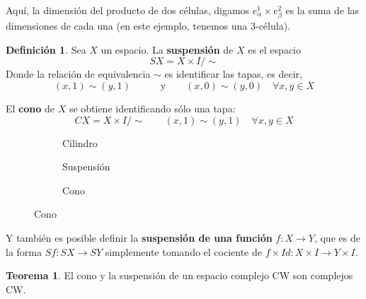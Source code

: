 \documentclass[spanish]{book}
\theoremstyle{definition}
\newtheorem*{defn}{Definición}
\newtheorem*{teo}{Teorema}
\begin{document}
	Aquí, la dimensión del producto de dos células, digamos $e^1_\alpha\times e^2_\beta$ es la suma de las dimensiones de cada una (en este ejemplo, tenemos una 3-célula).
	\begin{defn}
		Sea $X$ un espacio. La \textbf{suspensión} de $X$ es el espacio
				\[SX=X\times I/\sim\]
		Donde la relación de equivalencia $\sim$ es identificar las tapas, es decir,
		\[(x,1)\sim(y,1)\quad\qquad\text{y}\qquad(x,0)\sim(y,0)\quad\forall x,y\in X\]
		
		El \textbf{cono} de $X$ se obtiene identificando sólo una tapa: 
			\[CX=X\times I/\sim\qquad(x,1)\sim(y,1)\quad\forall x,y\in X\]
	\begin{figure}[H]
	\begin{subfigure}{0.3\textwidth}
		\centering
		\caption*{Cilindro}
	\end{subfigure}
	\begin{subfigure}{0.3\textwidth}
		\centering
		\caption*{Suspensión}
	\end{subfigure}
	\begin{subfigure}{0.3\textwidth}
		\centering
		\caption*{Cono}
	\end{subfigure}
	\end{figure}
	\label{fsusp}Y también es posible definir la \textbf{suspensión de una función} $f:X\to Y$, que es de la forma $Sf:SX\to SY$ simplemente tomando el cociente de $f\times Id:X\times I\to Y\times I$.
	\end{defn}
	\begin{teo}
		El cono y la suspensión de un espacio complejo CW son complejos CW.
	\end{teo}
\end{document}
